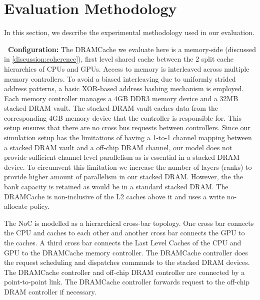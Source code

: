 \section{Evaluation Methodology} \label{methodology}
In this section, we describe the experimental methodology used in our evaluation. 

\par \textbf{\cachename\ Configuration:} The DRAMCache we evaluate here is a memory-side (discussed in \ref{discussion:coherence}),
first level shared cache between the 2 split cache hierarchies of CPUs and GPUs. Access to memory is interleaved across multiple memory controllers. To avoid a biased interleaving due to uniformly strided address patterns, a basic XOR-based address hashing mechanism is employed. Each memory controller manages a 4GB DDR3 memory device and a 32MB stacked DRAM vault. The stacked DRAM vault caches data from the corresponding 4GB memory device that the controller is responsible for. This setup ensures that there are no cross bus requests between controllers. Since our simulation setup has the limitations of having a 1-to-1 channel mapping between a stacked DRAM vault and a off-chip DRAM channel, our model does not provide sufficient channel level parallelism as is essential in a stacked DRAM device. To circumvent this limitation we increase the number of layers (ranks) to provide higher amount of parallelism in our stacked DRAM. However, the the bank capacity is retained as would be in a standard stacked DRAM. The DRAMCache is non-inclusive  \cite{coherence-dramcache} of the L2 caches above it and uses a write no-allocate policy.
\par The NoC is modelled as a hierarchical cross-bar topology. One cross bar connects the CPU and caches to each other and another cross bar connects the GPU to the caches. A third cross bar connects the Last Level Caches of the CPU and GPU to the DRAMCache memory controller. The DRAMCache controller does the request scheduling and dispatches commands to the stacked DRAM devices. The DRAMCache controller and off-chip DRAM controller are connected by a point-to-point link. The DRAMCache controller forwards request to the off-chip DRAM controller if necessary.


